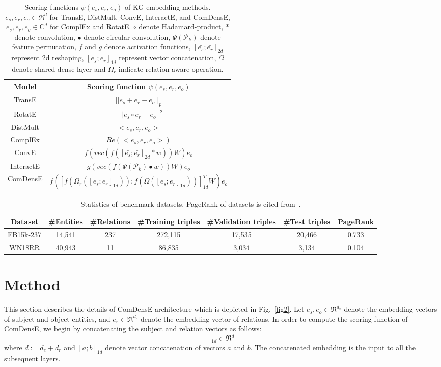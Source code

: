 \begin{table}
\centering
\caption{Scoring functions $\psi(e_s, e_r, e_o)$ of KG embedding methods. $e_s, e_r, e_o \in \Re^d$ for TransE, DistMult, ConvE, InteractE, and ComDensE, $e_s, e_r, e_o \in \mathrm{C}^d$ for ComplEx and RotatE. $\circ$ denote Hadamard-product, * denote convolution, $\bullet$ denote circular convolution, $\Psi(\mathcal{P}_k)$ denote feature permutation, $f$ and $g$ denote activation functions, $[\bar{e_s};\bar{e_r}]_{2d}$ represent 2d reshaping, $[e_s;e_r]_{1d}$ represent vector concatenation, $\Omega$ denote shared dense layer and $\Omega_r$ indicate relation-aware operation.}
\label{table1}
\begin{tabular}{c|c}
    \textbf{Model} & \textbf{Scoring function $\psi(e_s, e_r, e_o)$}\\
    \hline
    TransE & $||e_s + e_r - e_o||_p$\\
    RotatE & $-||e_s \circ e_r - e_o||^2$\\ 
    DistMult & $<e_s, e_r, e_o>$\\
    ComplEx & $Re(<e_s, e_r, e_o>)$\\
    ConvE & $f(vec(f([\bar{e_s};\bar{e_r}]_{2d} * w))W)e_o$\\
    InteractE & $g(vec(f(\Psi(\mathcal{P}_k) \bullet w))W)e_o$\\
    \hline
    ComDensE & $f([f(\Omega_r([e_s;e_r]_{1d})); f(\Omega([e_s;e_r]_{1d}))]_{1d}^TW)e_o$
\end{tabular}
\end{table}

\begin{table}[t]
\centering
\caption{Statistics of benchmark datasets. PageRank of datasets is cited from~\cite{dettmers2018convolutional}.}
\label{table2}
\begin{tabular}{c|c|c|c|c|c|c}
 \textbf{Dataset} &
 \textbf{\#Entities} &
 \textbf{\#Relations} &
 \textbf{\#Training triples} &
 \textbf{\#Validation triples} &
 \textbf{\#Test triples} &
 \textbf{PageRank} \\
 \hline
 FB15k-237 & 14,541 & 237 & 272,115 & 17,535 & 20,466 & 0.733 \\
 WN18RR & 40,943 & 11 & 86,835 & 3,034 & 3,134 & 0.104
 \\
\end{tabular}
\end{table}

\section{Method}
This section describes the details of ComDensE architecture which is depicted in Fig.~\ref{fig2}. Let $e_s, e_o \in \Re^{d_e}$ denote the embedding vectors of subject and object entities, and $e_r \in \Re^{d_r}$ denote the embedding vector of relations. In order to compute the scoring function of ComDensE, we begin by concatenating the subject and relation vectors as follows:
\begin{equation}
[e_s;e_r]_{1d} \in \Re^{d}  
\label{eq1}
\end{equation}
where $d := d_e + d_r$ and $[a;b]_{1d}$ denote vector concatenation of vectors $a$ and $b$. The concatenated embedding is the input to all the subsequent layers.


